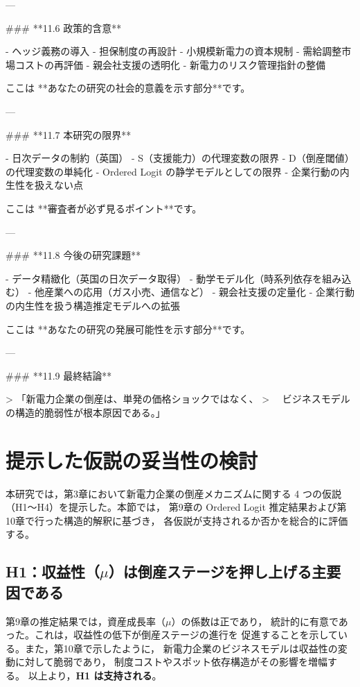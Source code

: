 ---

### **11.6 政策的含意**

- ヘッジ義務の導入  
- 担保制度の再設計  
- 小規模新電力の資本規制  
- 需給調整市場コストの再評価  
- 親会社支援の透明化  
- 新電力のリスク管理指針の整備  

ここは **あなたの研究の社会的意義を示す部分**です。

---

### **11.7 本研究の限界**

- 日次データの制約（英国）  
- S（支援能力）の代理変数の限界  
- D（倒産閾値）の代理変数の単純化  
- Ordered Logit の静学モデルとしての限界  
- 企業行動の内生性を扱えない点  

ここは **審査者が必ず見るポイント**です。

---

### **11.8 今後の研究課題**

- データ精緻化（英国の日次データ取得）  
- 動学モデル化（時系列依存を組み込む）  
- 他産業への応用（ガス小売、通信など）  
- 親会社支援の定量化  
- 企業行動の内生性を扱う構造推定モデルへの拡張  

ここは **あなたの研究の発展可能性を示す部分**です。

---

### **11.9 最終結論**

> 「新電力企業の倒産は、単発の価格ショックではなく、  
> 　ビジネスモデルの構造的脆弱性が根本原因である。」


\fi


\section{提示した仮説の妥当性の検討}

本研究では，第3章において新電力企業の倒産メカニズムに関する
4 つの仮説（H1～H4）を提示した。本節では，
第9章の Ordered Logit 推定結果および第10章で行った構造的解釈に基づき，
各仮説が支持されるか否かを総合的に評価する。

\subsection*{H1：収益性（$\mu$）は倒産ステージを押し上げる主要因である}

第9章の推定結果では，資産成長率（$\mu$）の係数は正であり，
統計的に有意であった。これは，収益性の低下が倒産ステージの進行を
促進することを示している。また，第10章で示したように，
新電力企業のビジネスモデルは収益性の変動に対して脆弱であり，
制度コストやスポット依存構造がその影響を増幅する。
以上より，\textbf{H1 は支持される}。

